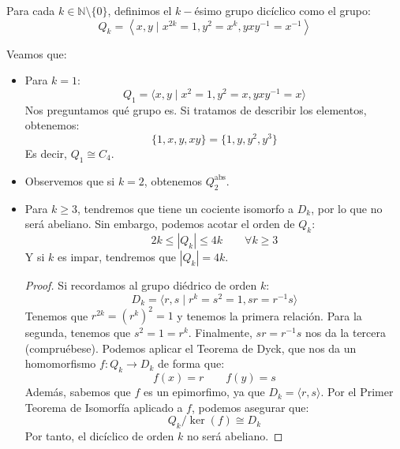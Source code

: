 \begin{definicion}
    Para cada $k\in \mathbb{N}\setminus \{0\}$, definimos el $k-$ésimo grupo dicíclico como el grupo:
    \begin{equation*}
        Q_k = \left\langle x,y \mid x^{2k} = 1, y^2 = x^k, yxy^{-1} = x^{-1}  \right\rangle 
    \end{equation*}
\end{definicion}

\begin{ejemplo}
    Veamos que:
    \begin{itemize}
        \item Para $k=1$:
            \begin{equation*}
                Q_1 = \langle x,y\mid x^2 = 1, y^2 = x, yxy^{-1} = x \rangle 
            \end{equation*}
            Nos preguntamos qué grupo es. Si tratamos de describir los elementos, obtenemos:
            \begin{equation*}
                \{1,x,y,xy\} = \{1,y,y^2,y^3\}
            \end{equation*}
            Es decir, $Q_1\cong C_4$.
        \item Observemos que si $k=2$, obtenemos $Q_2^\text{abs}$.
        \item Para $k\geq 3$, tendremos que tiene un cociente isomorfo a $D_k$, por lo que no será abeliano. Sin embargo, podemos acotar el orden de $Q_k$:
            \begin{equation*}
                2k \leq |Q_k| \leq 4k \qquad \forall k\geq 3
            \end{equation*}
            Y si $k$ es impar, tendremos que $|Q_k| = 4k$.
            \begin{proof}
                Si recordamos al grupo diédrico de orden $k$:
                \begin{equation*}
                    D_k = \langle r,s \mid r^k = s^2 = 1, sr = r^{-1}s \rangle 
                \end{equation*}
                Tenemos que $r^{2k} = {(r^{k})}^{2} = 1$ y tenemos la primera relación. Para la segunda, tenemos que $s^2 = 1 = r^k$. Finalmente, $sr = r^{-1}s$ nos da la tercera (compruébese). Podemos aplicar el Teorema de Dyck, que nos da un homomorfismo $f:Q_k\to D_k$ de forma que: %
                \begin{equation*}
                    f(x) = r \qquad f(y) = s
                \end{equation*}
                Además, sabemos que $f$ es un epimorfimo, ya que $D_k = \langle r,s \rangle $. Por el Primer Teorema de Isomorfía aplicado a $f$, podemos asegurar que:
                \begin{equation*}
                    Q_k/\ker(f)\cong D_k
                \end{equation*}
                Por tanto, el dicíclico de orden $k$ no será abeliano.  %


\end{proof}
\end{itemize}
\end{ejemplo}
